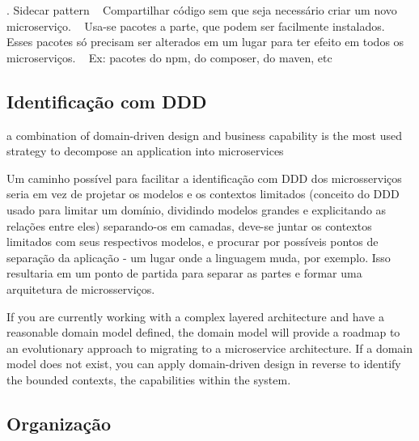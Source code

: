     . Sidecar pattern
        ~ Compartilhar código sem que seja necessário criar um novo microserviço.
        ~ Usa-se pacotes a parte, que podem ser facilmente instalados.
        ~ Esses pacotes só precisam ser alterados em um lugar para ter efeito em todos os microserviços.
        ~ Ex: pacotes do npm, do composer, do maven, etc

\subsection{Identificação com DDD}\label{praticas-identificacao-com-ddd}

a combination of domain-driven design and business capability is the most used strategy to decompose an application into microservices \cite{design-monitoring-testing-waseem}

Um caminho possível para facilitar a identificação com DDD dos microsserviços seria em vez de projetar os modelos e os contextos limitados (conceito do DDD usado para limitar um domínio, dividindo modelos grandes e explicitando as relações entre eles) separando-os em camadas, deve-se juntar os contextos limitados com seus respectivos modelos, e procurar por possíveis pontos de separação da aplicação - um lugar onde a linguagem muda, por exemplo. Isso resultaria em um ponto de partida para separar as partes e formar uma arquitetura de microsserviços. \cite{Familiar2015}

If you are currently working with a complex layered architecture and have a reasonable domain model defined, the domain model will provide a roadmap to an evolutionary approach to migrating to a microservice architecture. If a domain model does not exist, you can apply domain-driven design in reverse to identify the bounded contexts, the capabilities within the system. \cite{Familiar2015}


\subsection{Organização}


